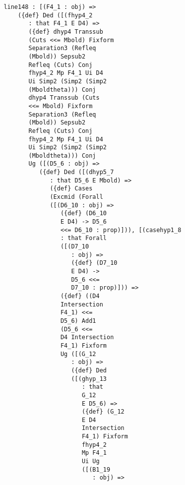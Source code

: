\documentclass[12pt]{article}
\begin{document}
\begin{verbatim}
               line148 : [(F4_1 : obj) => 
                   ({def} Ded ([(fhyp4_2 
                      : that F4_1 E D4) => 
                      ({def} dhyp4 Transsub 
                      (Cuts <<= Mbold) Fixform 
                      Separation3 (Refleq 
                      (Mbold)) Sepsub2 
                      Refleq (Cuts) Conj 
                      fhyp4_2 Mp F4_1 Ui D4 
                      Ui Simp2 (Simp2 (Simp2 
                      (Mboldtheta))) Conj 
                      dhyp4 Transsub (Cuts 
                      <<= Mbold) Fixform 
                      Separation3 (Refleq 
                      (Mbold)) Sepsub2 
                      Refleq (Cuts) Conj 
                      fhyp4_2 Mp F4_1 Ui D4 
                      Ui Simp2 (Simp2 (Simp2 
                      (Mboldtheta))) Conj 
                      Ug ([(D5_6 : obj) => 
                         ({def} Ded ([(dhyp5_7 
                            : that D5_6 E Mbold) => 
                            ({def} Cases 
                            (Excmid (Forall 
                            ([(D6_10 : obj) => 
                               ({def} (D6_10 
                               E D4) -> D5_6 
                               <<= D6_10 : prop)])), [(casehyp1_8 
                               : that Forall 
                               ([(D7_10 
                                  : obj) => 
                                  ({def} (D7_10 
                                  E D4) -> 
                                  D5_6 <<= 
                                  D7_10 : prop)])) => 
                               ({def} ((D4 
                               Intersection 
                               F4_1) <<= 
                               D5_6) Add1 
                               (D5_6 <<= 
                               D4 Intersection 
                               F4_1) Fixform 
                               Ug ([(G_12 
                                  : obj) => 
                                  ({def} Ded 
                                  ([(ghyp_13 
                                     : that 
                                     G_12 
                                     E D5_6) => 
                                     ({def} (G_12 
                                     E D4 
                                     Intersection 
                                     F4_1) Fixform 
                                     fhyp4_2 
                                     Mp F4_1 
                                     Ui Ug 
                                     ([(B1_19 
                                        : obj) => 

\end{verbatim}
\end{document}
